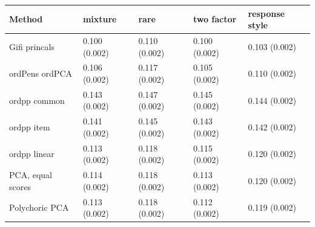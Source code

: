 \begin{tabular}{lllll}
\toprule
Method & mixture & rare & two factor & response style \\
\midrule
Gifi princals & 0.100 (0.002) & 0.110 (0.002) & 0.100 (0.002) & 0.103 (0.002) \\
ordPens ordPCA & 0.106 (0.002) & 0.117 (0.002) & 0.105 (0.002) & 0.110 (0.002) \\
ordpp common & 0.143 (0.002) & 0.147 (0.002) & 0.145 (0.002) & 0.144 (0.002) \\
ordpp item & 0.141 (0.002) & 0.145 (0.002) & 0.143 (0.002) & 0.142 (0.002) \\
ordpp linear & 0.113 (0.002) & 0.118 (0.002) & 0.115 (0.002) & 0.120 (0.002) \\
PCA, equal scores & 0.114 (0.002) & 0.118 (0.002) & 0.113 (0.002) & 0.120 (0.002) \\
Polychoric PCA & 0.113 (0.002) & 0.118 (0.002) & 0.112 (0.002) & 0.119 (0.002) \\
\bottomrule
\end{tabular}
